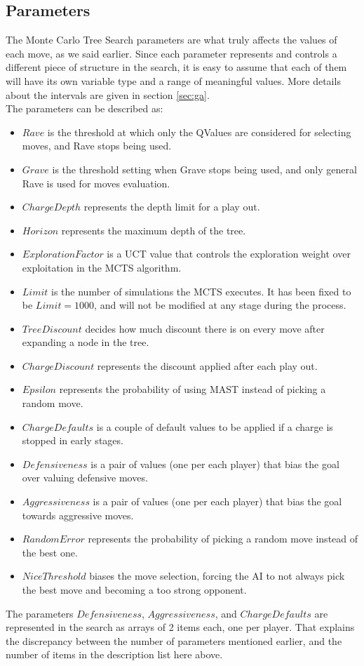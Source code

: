 \subsection{Parameters}\label{subsec:param}
The Monte Carlo Tree Search parameters are what truly affects the values of each move, as we said earlier. Since each parameter represents and controls a different piece of structure in the search, it is easy to assume that each of them will have its own variable type and a range of meaningful values. More details about the intervals are given in section \ref{sec:ga}. \\
The parameters can be described as:
\begin{itemize}
	\item $Rave$ is the threshold at which only the QValues are considered for selecting moves, and Rave stops being used.
	\item $Grave$ is the threshold setting when Grave stops being used, and only general Rave is used for moves evaluation.
	\item $Charge Depth$ represents the depth limit for a play out.
	\item $Horizon$ represents the maximum depth of the tree.
	\item $Exploration Factor$ is a UCT value that controls the exploration weight over exploitation in the MCTS algorithm.
    \item $Limit$ is the number of simulations the MCTS executes. It has been fixed to be $Limit = 1000$, and will not be modified at any stage during the process.
	\item $Tree Discount$ decides how much discount there is on every move after expanding a node in the tree.
	\item $Charge Discount$ represents the discount applied after each play out.
	\item $Epsilon$ represents the probability of using MAST instead of picking a random move.
    \item $Charge Defaults$ is a couple of default values to be applied if a charge is stopped in early stages.
	\item $Defensiveness$ is a pair of values (one per each player) that bias the goal over valuing defensive moves.
	\item $Aggressiveness$ is a pair of values (one per each player) that bias the goal towards aggressive moves.
    \item $Random Error$ represents the probability of picking a random move instead of the best one.
    \item $Nice Threshold$ biases the move selection, forcing the AI to not always pick the best move and becoming a too strong opponent.
\end{itemize}
The parameters $Defensiveness$, $Aggressiveness$, and $Charge Defaults$ are represented in the search as arrays of 2 items each, one per player. That explains the discrepancy between the number of parameters mentioned earlier, and the number of items in the description list here above.
